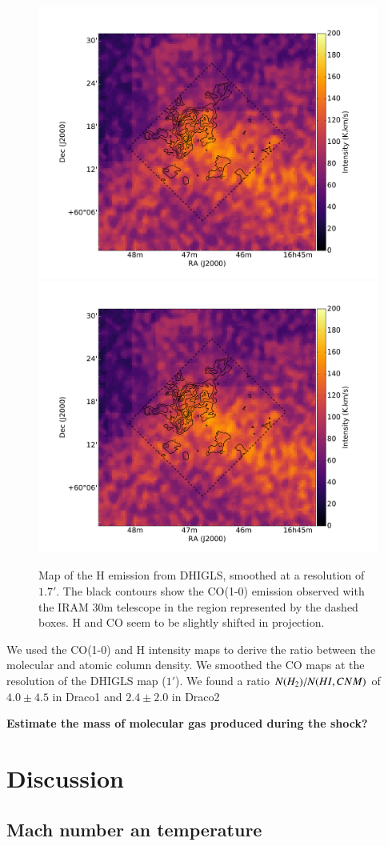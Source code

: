 \documentclass[traditabstract]{aa}
\begin{document}
\begin{figure}[h!]
  \centering
  \includegraphics[page=1,width=0.48\linewidth,trim=65 35 115 75,clip=true]{Figures/HI-CO.pdf}
  \hspace{3mm}
  \includegraphics[page=2,width=0.48\linewidth,trim=65 35 115 75,clip=true]{Figures/HI-CO.pdf}
  \caption{\label{DRAO-CO} Map of the H emission from DHIGLS, smoothed at a resolution of $1.7'$. The black contours show the CO(1-0) emission observed with the IRAM 30m telescope in the region represented by the dashed boxes. H and CO seem to be slightly shifted in projection.}
\end{figure}

   We used the CO(1-0) and H intensity maps to derive the ratio between the molecular and atomic column density. We smoothed the CO maps at the resolution of the DHIGLS map ($1'$). We found a ratio $N(H_2)/N(H\rmnum{1},CNM)$ of $4.0\pm 4.5$ in Draco1 and $2.4\pm 2.0$ in Draco2

\textbf{Estimate the mass of molecular gas produced during the shock?}




\section{Discussion}
\label{sec:discussion}

   \subsection{Mach number an temperature}
\end{document}
